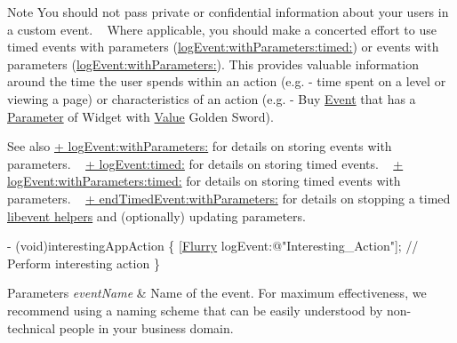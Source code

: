 \begin{DoxyNote}{Note}
You should not pass private or confidential information about your users in a custom event. ~\newline
 Where applicable, you should make a concerted effort to use timed events with parameters (\hyperlink{interfaceFlurry_a66eeaeb9725692dc354fdd350c691cfc}{log\+Event\+:with\+Parameters\+:timed\+:}) or events with parameters (\hyperlink{interfaceFlurry_a655ffe3bf02112f3af25414397ded072}{log\+Event\+:with\+Parameters\+:}). This provides valuable information around the time the user spends within an action (e.\+g. -\/ time spent on a level or viewing a page) or characteristics of an action (e.\+g. -\/ Buy \hyperlink{classEvent}{Event} that has a \hyperlink{structParameter}{Parameter} of Widget with \hyperlink{classValue}{Value} Golden Sword).
\end{DoxyNote}
\begin{DoxySeeAlso}{See also}
\hyperlink{interfaceFlurry_a655ffe3bf02112f3af25414397ded072}{+ log\+Event\+:with\+Parameters\+:} for details on storing events with parameters. ~\newline
 \hyperlink{interfaceFlurry_ad1beb2e7875ce565f74b35d973f9fe42}{+ log\+Event\+:timed\+:} for details on storing timed events. ~\newline
 \hyperlink{interfaceFlurry_a66eeaeb9725692dc354fdd350c691cfc}{+ log\+Event\+:with\+Parameters\+:timed\+:} for details on storing timed events with parameters. ~\newline
 \hyperlink{interfaceFlurry_a9540add7440d1b716bfb8fb8efa85801}{+ end\+Timed\+Event\+:with\+Parameters\+:} for details on stopping a timed \hyperlink{group__event}{libevent helpers} and (optionally) updating parameters.
\end{DoxySeeAlso}

\begin{DoxyCode}
   - (void)interestingAppAction 
\{
[\hyperlink{interfaceFlurry}{Flurry} logEvent:\textcolor{stringliteral}{@"Interesting\_Action"}];
\textcolor{comment}{// Perform interesting action}
\}
\end{DoxyCode}



\begin{DoxyParams}{Parameters}
{\em event\+Name} & Name of the event. For maximum effectiveness, we recommend using a naming scheme that can be easily understood by non-\/technical people in your business domain. \\
\hline
\end{DoxyParams}
\mbox{\label{interfaceFlurry_ad1beb2e7875ce565f74b35d973f9fe42}} 
